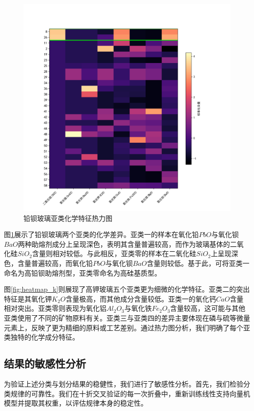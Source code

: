 \begin{figure}[H]
\begin{minipage}{0.48\textwidth}
        \includegraphics[width=\linewidth]{figs/4问题二/铅钡玻璃_亚类热力图_带编号.png}
        \caption{铅钡玻璃亚类化学特征热力图}
        \label{fig:heatmap_pb}
    \end{minipage}
\end{figure}

图\ref{fig:heatmap_pb}展示了铅钡玻璃两个亚类的化学差异。亚类一的样本在氧化铅$PbO$与氧化钡$BaO$两种助熔剂成分上呈现深色，表明其含量普遍较高，而作为玻璃基体的二氧化硅$SiO_2$含量则相对较低。与此相反，亚类零的样本在二氧化硅$SiO_2$上呈现深色，含量普遍较高，而氧化铅$PbO$与氧化钡$BaO$含量则较低。基于此，可将亚类一命名为高铅钡助熔剂型，亚类零命名为高硅基质型。

图\ref{fig:heatmap_k}则展现了高钾玻璃五个亚类更为细微的化学特征。亚类二的突出特征是其氧化钾$K_2O$含量极高，而其他成分含量较低。亚类一的氧化钙$CaO$含量相对突出。亚类零则表现为氧化铝$Al_2O_3$与氧化铁$Fe_2O_3$含量较高，这可能与其他亚类使用了不同的矿物原料有关。亚类三与亚类四的差异主要体现在磷与硫等微量元素上，反映了更为精细的原料或工艺差别。通过热力图分析，我们明确了每个亚类独特的化学成分特征。


\subsection{结果的敏感性分析}

为验证上述分类与划分结果的稳健性，我们进行了敏感性分析。首先，我们检验分类规律的可靠性。我们在十折交叉验证的每一次折叠中，重新训练线性支持向量机模型并提取其权重，以评估规律本身的稳定性。

